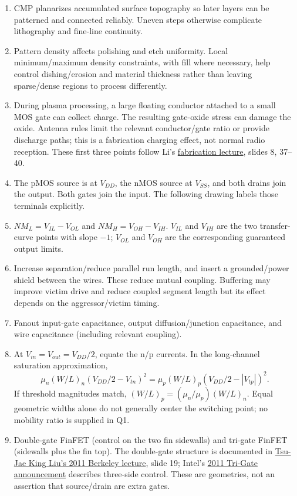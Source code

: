 \documentclass[10pt]{article}
\begin{document}
\begin{enumerate}[label=(\alph*),leftmargin=7mm]
\item CMP planarizes accumulated surface topography so later layers can be patterned and connected reliably. Uneven steps otherwise complicate lithography and fine-line continuity.
\item Pattern density affects polishing and etch uniformity. Local minimum/maximum density constraints, with fill where necessary, help control dishing/erosion and material thickness rather than leaving sparse/dense regions to process differently.
\item During plasma processing, a large floating conductor attached to a small MOS gate can collect charge. The resulting gate-oxide stress can damage the oxide. Antenna rules limit the relevant conductor/gate ratio or provide discharge paths; this is a fabrication charging effect, not normal radio reception. These first three points follow Li's \href{https://www.ee.ncu.edu.tw/jfli/public_html/VLSI/lecture/ch03.pdf}{fabrication lecture}, slides 8, 37--40.
\item The pMOS source is at $V_{DD}$, the nMOS source at $V_{SS}$, and both drains join the output. Both gates join the input. The following drawing labels those terminals explicitly.
\item $NM_L=V_{IL}-V_{OL}$ and $NM_H=V_{OH}-V_{IH}$. $V_{IL}$ and $V_{IH}$ are the two transfer-curve points with slope $-1$; $V_{OL}$ and $V_{OH}$ are the corresponding guaranteed output limits.
\item Increase separation/reduce parallel run length, and insert a grounded/power shield between the wires. These reduce mutual coupling. Buffering may improve victim drive and reduce coupled segment length but its effect depends on the aggressor/victim timing.
\item Fanout input-gate capacitance, output diffusion/junction capacitance, and wire capacitance (including relevant coupling).
\item At $V_{in}=V_{out}=V_{DD}/2$, equate the n/p currents. In the long-channel saturation approximation,
\[\mu_n(W/L)_n\left(V_{DD}/2-V_{tn}\right)^2
=\mu_p(W/L)_p\left(V_{DD}/2-|V_{tp}|\right)^2.\]
If threshold magnitudes match, $(W/L)_p=(\mu_n/\mu_p)(W/L)_n$. Equal geometric widths alone do not generally center the switching point; no mobility ratio is supplied in Q1.
\item Double-gate FinFET (control on the two fin sidewalls) and tri-gate FinFET (sidewalls plus the fin top). The double-gate structure is documented in \href{https://www2.eecs.berkeley.edu/Colloquium/Archives/11-12/Fall2011/kingliu-presentation.pdf}{Tsu-Jae King Liu's 2011 Berkeley lecture}, slide 19; Intel's \href{https://www.intc.com/news-events/press-releases/detail/655/intel-reinvents-transistors-using-new-3-d-structure}{2011 Tri-Gate announcement} describes three-side control. These are geometries, not an assertion that source/drain are extra gates.

\end{enumerate}
\end{document}
